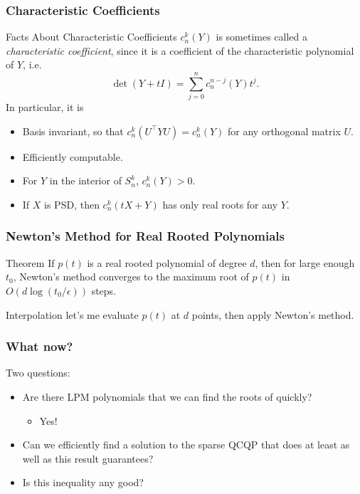 \documentclass{beamer}
\begin{document}
\begin{frame}
    \frametitle{Characteristic Coefficients}
    \begin{block}{Facts About Characteristic Coefficients}
        $c_n^k(Y)$ is sometimes called a \emph{characteristic coefficient}, since it is a coefficient of the characteristic polynomial of $Y$, i.e.
        \[
            \det(Y + tI) = \sum_{j=0}^n c_n^{n-j}(Y) t^j.
        \]
        \pause
        In particular, it is
        \begin{itemize}
            \item Basis invariant, so that $c_n^k(U^{\intercal} Y U) = c_n^k(Y)$ for any orthogonal matrix $U$.
            \pause
            \item Efficiently computable.
            \pause
            \item For $Y$ in the interior of $S^k_n$, $c_n^k(Y) > 0$.
            \pause
            \item If $X$ is PSD, then $c_n^k(tX+Y)$ has only real roots for any $Y$.
        \end{itemize}
    \end{block}
\end{frame}
\begin{frame}
    \frametitle{Newton's Method for Real Rooted Polynomials}
    \begin{block}{Theorem}
        If $p(t)$ is a real rooted polynomial of degree $d$, then for large enough $t_0$, Newton's method converges to the maximum root of $p(t)$ in $O(d \log(t_0 / \epsilon))$ steps.
    \end{block}
    Interpolation let's me evaluate $p(t)$ at $d$ points, then apply Newton's method.
\end{frame}
\begin{frame}
    \frametitle{What now?}
    Two questions:
    \begin{itemize}
        \item Are there LPM polynomials that we can find the roots of quickly?
            \begin{itemize}
                \item Yes!
            \end{itemize}
        \item Can we efficiently find a solution to the sparse QCQP that does at least as well as this result guarantees?
        \item Is this inequality any good?
    \end{itemize}
\end{frame}
\end{document}
